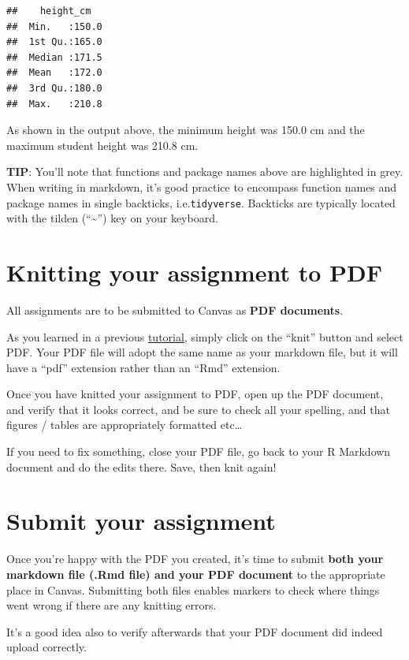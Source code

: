 \documentclass[
]{book}
\begin{document}
\begin{verbatim}
##    height_cm    
##  Min.   :150.0  
##  1st Qu.:165.0  
##  Median :171.5  
##  Mean   :172.0  
##  3rd Qu.:180.0  
##  Max.   :210.8
\end{verbatim}

As shown in the output above, the minimum height was 150.0 cm and the maximum student height was 210.8 cm.

\textbf{TIP}: You'll note that functions and package names above are highlighted in grey. When writing in markdown, it's good practice to encompass function names and package names in single backticks, i.e.\texttt{\textasciigrave{}tidyverse\textasciigrave{}}. Backticks are typically located with the tilden (``\textasciitilde{}'') key on your keyboard.

\section{Knitting your assignment to PDF}\label{knit_assign}

All assignments are to be submitted to Canvas as \textbf{PDF documents}.

As you learned in a previous \hyperref[veryify_knit]{tutorial}, simply click on the ``knit'' button and select PDF. Your PDF file will adopt the same name as your markdown file, but it will have a ``pdf'' extension rather than an ``Rmd'' extension.

Once you have knitted your assignment to PDF, open up the PDF document, and verify that it looks correct, and be sure to check all your spelling, and that figures / tables are appropriately formatted etc\ldots{}

If you need to fix something, close your PDF file, go back to your R Markdown document and do the edits there. Save, then knit again!

\section{Submit your assignment}\label{submit_rmd}

Once you're happy with the PDF you created, it's time to submit \textbf{both your markdown file (.Rmd file) and your PDF document} to the appropriate place in Canvas. Submitting both files enables markers to check where things went wrong if there are any knitting errors.

It's a good idea also to verify afterwards that your PDF document did indeed upload correctly.
\end{document}

